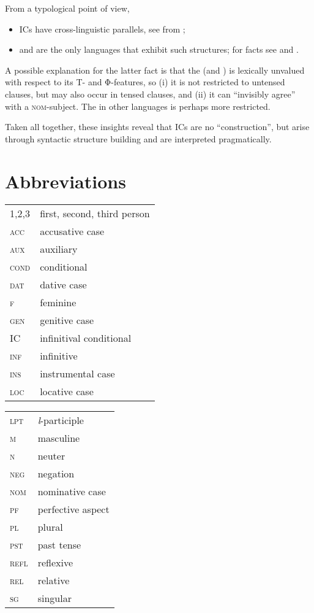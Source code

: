\documentclass[output=paper,colorlinks,citecolor=brown,newtxmath]{langsci/langscibook}
\begin{document}
From a typological point of view,
\begin{itemize}
	\item ICs have cross-linguistic parallels, see  from ;
	\item {} and  are the only  languages that exhibit such structures; for  facts see \citet{Ruzicka1956} and \citet{Hirschova2005}.
\end{itemize}

\noindent A possible explanation for the latter fact is that the  (and )  is lexically unvalued with respect to its T- and Φ-features, so (i) it is not restricted to untensed clauses, but may also occur in tensed clauses, and (ii) it can ``invisibly agree'' with a \textsc{nom}-subject. The  in other  languages is perhaps more restricted.

Taken all together, these insights reveal that ICs are no ``construction'', but arise through syntactic structure building and are interpreted pragmatically.

\section*{Abbreviations}
\begin{tabularx}{.58\textwidth}{lX}
	1,2,3 & first, second, third person\\
 	\textsc{acc} & {accusative case}\\
	\textsc{aux} & auxiliary\\
    \textsc{cond} & conditional\\
	\textsc{dat} & {dative} case\\
	\textsc{f} & feminine \\
	\textsc{gen} & {genitive case}\\
	{IC} & infinitival conditional \\
    \textsc{inf} & {infinitive}\\
	\textsc{ins} & instrumental case\\
	\textsc{loc} & locative case\\
\end{tabularx}
\begin{tabularx}{.38\textwidth}{lX}
	\textsc{lpt} & \textit{l}-{participle} \\
	\textsc{m} & masculine\\
	\textsc{n} & neuter\\
 	\textsc{neg} & {negation}\\
	\textsc{nom} & {nominative case}\\
    \textsc{pf} & {perfective} aspect\\
	\textsc{pl} & plural\\
    \textsc{pst} & past {tense}\\
    \textsc{refl} & {reflexive}\\
    \textsc{rel} & {relative} \\
    \textsc{sg} & singular \\
\end{tabularx}
\end{document}
